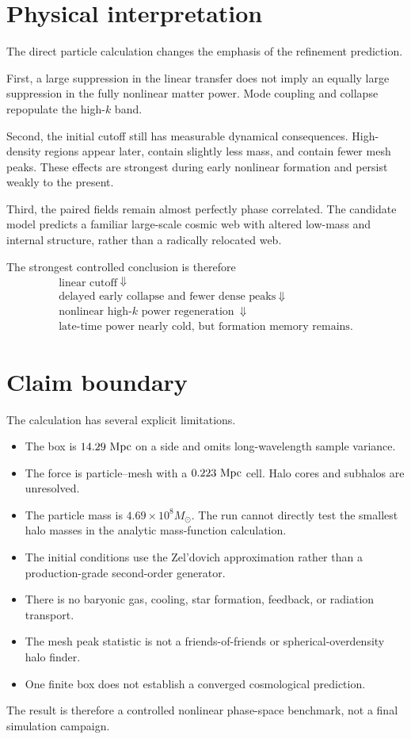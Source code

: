 \section{Physical interpretation}

The direct particle calculation changes the emphasis of the refinement prediction.

First, a large suppression in the linear transfer does not imply an equally large suppression in the fully nonlinear matter power.  Mode coupling and collapse repopulate the high-$k$ band.

Second, the initial cutoff still has measurable dynamical consequences.  High-density regions appear later, contain slightly less mass, and contain fewer mesh peaks.  These effects are strongest during early nonlinear formation and persist weakly to the present.

Third, the paired fields remain almost perfectly phase correlated.  The candidate model predicts a familiar large-scale cosmic web with altered low-mass and internal structure, rather than a radically relocated web.

The strongest controlled conclusion is therefore
\begin{equation}
 \boxed{
 \begin{gathered}
 \text{linear cutoff}\
 \Downarrow\\
 \text{delayed early collapse and fewer dense peaks}\
 \Downarrow\\
 \text{nonlinear high-}k\text{ power regeneration}\
 \Downarrow\\
 \text{late-time power nearly cold, but formation memory remains}.
 \end{gathered}
 }
 \label{eq:pm-physical-chain}
\end{equation}

\section{Claim boundary}

The calculation has several explicit limitations.
\begin{itemize}[leftmargin=2em]
\item The box is $14.29\ {\rm Mpc}$ on a side and omits long-wavelength sample variance.
\item The force is particle--mesh with a $0.223\ {\rm Mpc}$ cell.  Halo cores and subhalos are unresolved.
\item The particle mass is $4.69\times10^8M_\odot$.  The run cannot directly test the smallest halo masses in the analytic mass-function calculation.
\item The initial conditions use the Zel'dovich approximation rather than a production-grade second-order generator.
\item There is no baryonic gas, cooling, star formation, feedback, or radiation transport.
\item The mesh peak statistic is not a friends-of-friends or spherical-overdensity halo finder.
\item One finite box does not establish a converged cosmological prediction.
\end{itemize}

The result is therefore a controlled nonlinear phase-space benchmark, not a final simulation campaign.
